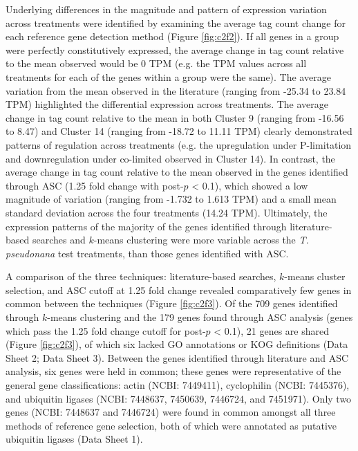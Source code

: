 	Underlying differences in the magnitude and pattern of expression variation across treatments were identified by examining the average tag count change for each reference gene detection method (Figure \ref{fig:c2f2}). If all genes in a group were perfectly constitutively expressed, the average change in tag count relative to the mean observed would be 0 TPM (e.g. the TPM values across all treatments for each of the genes within a group were the same). The average variation from the mean observed in the literature (ranging from -25.34 to 23.84 TPM) highlighted the differential expression across treatments. The average change in tag count relative to the mean in both Cluster 9 (ranging from -16.56 to 8.47) and Cluster 14 (ranging from -18.72 to 11.11 TPM) clearly demonstrated patterns of regulation across treatments (e.g. the upregulation under P-limitation and downregulation under co-limited observed in Cluster 14). In contrast, the average change in tag count relative to the mean observed in the genes identified through ASC (1.25 fold change with post-$p$ < 0.1), which showed a low magnitude of variation (ranging from -1.732 to 1.613 TPM) and a small mean standard deviation across the four treatments (14.24 TPM). Ultimately, the expression patterns of the majority of the genes identified through literature-based searches and $k$-means clustering were more variable across the \textit{T. pseudonana} test treatments, than those genes identified with ASC.\par	 
A comparison of the three techniques: literature-based searches, $k$-means cluster selection, and ASC cutoff at 1.25 fold change revealed comparatively few genes in common between the techniques (Figure \ref{fig:c2f3}). Of the 709 genes identified through $k$-means clustering and the 179 genes found through ASC analysis (genes which pass the 1.25 fold change cutoff for post-$p$ < 0.1), 21 genes are shared (Figure \ref{fig:c2f3}), of which six lacked GO annotations or KOG definitions (Data Sheet 2; Data Sheet 3). Between the genes identified through literature and ASC analysis, six genes were held in common; these genes were representative of the general gene classifications: actin (NCBI: 7449411), cyclophilin (NCBI: 7445376), and ubiquitin ligases (NCBI: 7448637, 7450639, 7446724, and 7451971). Only two genes (NCBI: 7448637 and 7446724) were found in common amongst all three methods of reference gene selection, both of which were annotated as putative ubiquitin ligases (Data Sheet 1). \par

